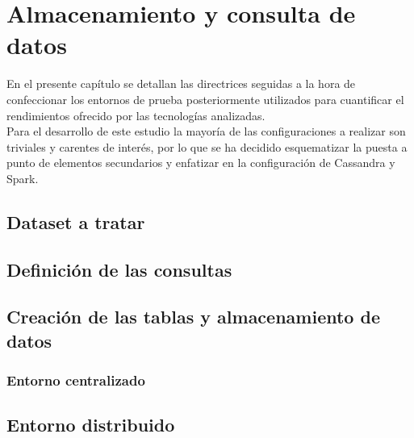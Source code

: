 
\pagestyle{fancy}

\chapter{Almacenamiento y consulta de datos}
\label{almacenamiento_datos}

En el presente capítulo se detallan las directrices seguidas a la hora de confeccionar los entornos de prueba posteriormente utilizados para cuantificar el rendimientos ofrecido por las tecnologías analizadas.\\

Para el desarrollo de este estudio la mayoría de las configuraciones a realizar son triviales y carentes de interés, por lo que se ha decidido esquematizar la puesta a punto de elementos secundarios y enfatizar en la configuración de Cassandra y Spark.\\

\section{Dataset a tratar}

\section{Definición de las consultas}

\section{Creación de las tablas y almacenamiento de datos}

\subsection{Entorno centralizado}

\section{Entorno distribuido}



